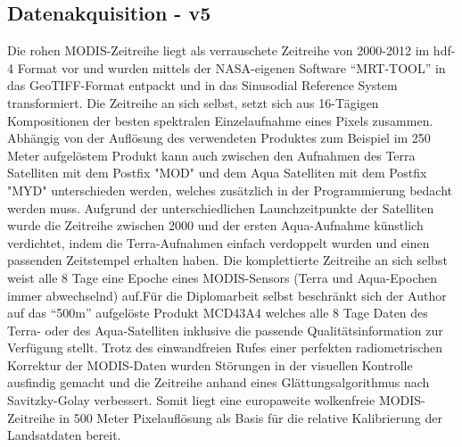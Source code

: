 \documentclass[11pt]{report}
\begin{document}
\subsection{Datenakquisition - v5}
Die  rohen MODIS-Zeitreihe liegt als verrauschete Zeitreihe von 2000-2012 im hdf-4 Format vor und  wurden mittels der NASA-eigenen Software "`MRT-TOOL"' in das GeoTIFF-Format entpackt und in das Sinusodial Reference System transformiert. Die Zeitreihe an sich selbst, setzt sich aus 16-Tägigen Kompositionen der besten spektralen Einzelaufnahme eines Pixels zusammen. Abhängig von der Auflösung des verwendeten Produktes zum Beispiel im 250 Meter aufgelöstem Produkt kann auch zwischen den Aufnahmen des Terra Satelliten mit dem Postfix "MOD" und dem Aqua Satelliten mit dem Postfix "MYD" unterschieden werden, welches zusätzlich in der Programmierung bedacht werden muss. Aufgrund der unterschiedlichen Launchzeitpunkte der Satelliten wurde die Zeitreihe zwischen 2000 und der ersten Aqua-Aufnahme künstlich verdichtet, indem die Terra-Aufnahmen einfach verdoppelt wurden und einen passenden Zeitstempel erhalten haben. Die komplettierte Zeitreihe an sich selbst weist alle 8 Tage eine Epoche eines MODIS-Sensors (Terra und Aqua-Epochen immer abwechselnd) auf.Für die Diplomarbeit selbst beschränkt sich der Author auf das "`500m"' aufgelöste Produkt MCD43A4 welches alle 8 Tage Daten des Terra- oder des Aqua-Satelliten inklusive die passende Qualitätsinformation zur Verfügung stellt.
Trotz des einwandfreien Rufes einer perfekten radiometrischen Korrektur der MODIS-Daten wurden Störungen in der visuellen Kontrolle ausfindig gemacht und die Zeitreihe anhand eines Glättungsalgorithmus nach Savitzky-Golay verbessert. Somit liegt eine europaweite wolkenfreie MODIS-Zeitreihe in 500 Meter Pixelauflösung als Basis für die relative Kalibrierung der Landsatdaten bereit.
\end{document}
